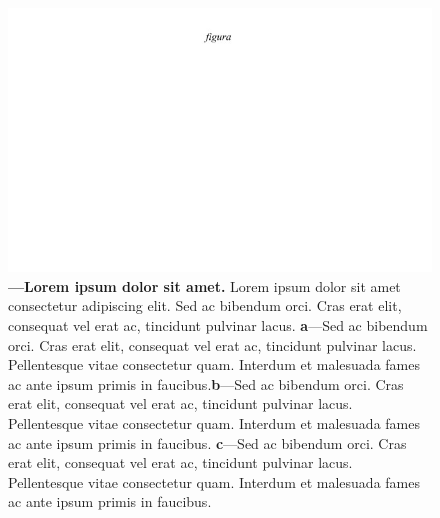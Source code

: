 \documentclass[./main.tex]{subfiles}
\begin{document}
\begin{figure}[t!] 
\centering				
\includegraphics[width=0.95\linewidth]{figs/fig_m.jpg}		
\caption[Lorem ipsum dolor sit amet]
{\textbf{---\;Lorem ipsum dolor sit amet.}
    Lorem ipsum dolor sit amet consectetur adipiscing elit. Sed ac bibendum orci. Cras erat elit, consequat vel erat ac, tincidunt pulvinar lacus. \;\textbf{a}\;---\;Sed ac bibendum orci. Cras erat elit, consequat vel erat ac, tincidunt pulvinar lacus. Pellentesque vitae consectetur quam. Interdum et malesuada fames ac ante ipsum primis in faucibus.\;\textbf{b}\;---\;Sed ac bibendum orci. Cras erat elit, consequat vel erat ac, tincidunt pulvinar lacus. Pellentesque vitae consectetur quam. Interdum et malesuada fames ac ante ipsum primis in faucibus. \;\textbf{c}\;---\;Sed ac bibendum orci. Cras erat elit, consequat vel erat ac, tincidunt pulvinar lacus. Pellentesque vitae consectetur quam. Interdum et malesuada fames ac ante ipsum primis in faucibus.
}
\label{fig:hydro:intro} 		
\end{figure}
\end{document}
